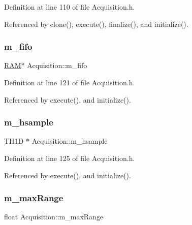 Definition at line 110 of file Acquisition.\+h.



Referenced by clone(), execute(), finalize(), and initialize().

\mbox{\label{classAcquisition_a8a893e7485e96da01185df6d1109c0bc}} 
\subsubsection{\texorpdfstring{m\+\_\+fifo}{m\_fifo}}
{\footnotesize\ttfamily \hyperlink{classRAM}{R\+AM}$\ast$ Acquisition\+::m\+\_\+fifo\hspace{0.3cm}{\ttfamily [private]}}



Definition at line 121 of file Acquisition.\+h.



Referenced by execute(), and initialize().

\mbox{\label{classAcquisition_ad0078b0c53eb14f13fdd16763df3be8e}} 
\subsubsection{\texorpdfstring{m\+\_\+hsample}{m\_hsample}}
{\footnotesize\ttfamily T\+H1D $\ast$ Acquisition\+::m\+\_\+hsample\hspace{0.3cm}{\ttfamily [private]}}



Definition at line 125 of file Acquisition.\+h.



Referenced by execute(), and initialize().

\mbox{\label{classAcquisition_a45478629e9db582470b4b158edb46616}} 
\subsubsection{\texorpdfstring{m\+\_\+max\+Range}{m\_maxRange}}
{\footnotesize\ttfamily float Acquisition\+::m\+\_\+max\+Range\hspace{0.3cm}{\ttfamily [private]}}



